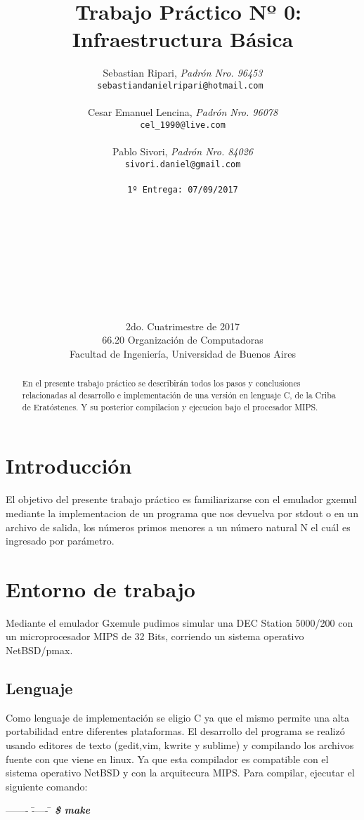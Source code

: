 \documentclass[a4paper,10pt]{article}
\title{	\ Trabajo Práctico Nº 0: Infraestructura Básica}
\author{	Sebastian Ripari, \textit{Padrón Nro. 96453}\\
            \texttt{sebastiandanielripari@hotmail.com }\\\\
            Cesar Emanuel Lencina, \textit{Padrón Nro. 96078}\\
            \texttt{cel_1990@live.com}\\\\
			Pablo Sivori, \textit{Padrón Nro. 84026}\\
            \texttt{sivori.daniel@gmail.com}\\\\               
            \texttt{\footnotesize 1º Entrega: 07/09/2017}\\
            \\\\\\\\\\\\\\\\\\
            \normalsize{2do. Cuatrimestre de 2017}\\ 
            \normalsize{66.20 Organización de Computadoras} \\
            \normalsize{Facultad de Ingeniería, Universidad de Buenos Aires} \\}
\date{}
\begin{document}
\maketitle
\thispagestyle{empty}
\begin{abstract}
En el presente trabajo práctico se describirán todos los pasos y 
conclusiones relacionadas al desarrollo e implementación de una versión en lenguaje C,
de la Criba de Eratóstenes. Y su posterior compilacion y ejecucion bajo el procesador MIPS.
\end{abstract}
\newpage{}
\tableofcontents
\newpage{}

\begin{flushleft}

\par\end{flushleft}
\section{{\normalsize Introducción}}

El objetivo del presente trabajo práctico es familiarizarse con el emulador gxemul mediante la implementacion de un programa que nos devuelva por stdout o en un archivo de salida, los números primos menores a un número natural N el cuál es ingresado por parámetro.

\section{{\normalsize Entorno de trabajo}}
Mediante el emulador Gxemule pudimos simular una DEC Station 5000/200 con un microprocesador MIPS de 32 Bits, corriendo un sistema 
operativo NetBSD/pmax.

\subsection{{\normalsize Lenguaje}}

Como lenguaje de implementación se eligio C ya que el mismo permite una alta portabilidad entre 
diferentes plataformas. El desarrollo del programa se realizó usando editores de texto 
(gedit,vim, kwrite y sublime) y compilando los archivos fuente con 
 que viene en linux. Ya que esta compilador es compatible
con el sistema operativo NetBSD y con la arquitecura MIPS.
Para compilar, ejecutar el siguiente comando:

\begin{tabbing}
------- \= ----- \= \kill
\> \textbf{\emph{\$ make}}\\ 
\end{tabbing}
\end{document}
